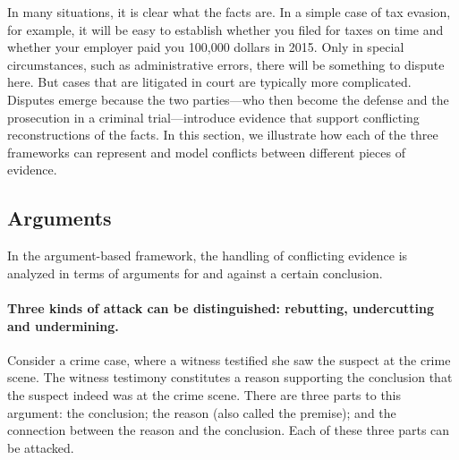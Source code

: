 \documentclass[10pt]{article}
\begin{document}
In many situations, it is clear what the facts are. In a simple case of tax evasion, for example, 
it will be easy to establish whether you filed for taxes on time and whether your employer paid you 100,000 dollars in 2015. Only in special circumstances, 
such as administrative errors, there will be something to dispute here. 
But cases that are litigated in court are typically more complicated.
Disputes emerge because the two parties---who then become the defense and the 
prosecution in a criminal trial---introduce evidence that support conflicting 
reconstructions of the facts. In this section, we illustrate how 
each of the three frameworks can represent and model conflicts 
between different pieces of evidence. 





\subsection{Arguments}
\label{sec:confArg}


In the argument-based framework, the handling of conflicting evidence is analyzed 
in terms of arguments for and against a certain conclusion.


\paragraph{Three kinds of attack can be distinguished: rebutting, undercutting and undermining.}

Consider a crime case, where a witness testified she saw the suspect at the crime scene. The witness testimony constitutes a 
reason supporting the conclusion that the suspect indeed was at the crime scene. There are three parts to this argument: the conclusion; the reason (also called the premise); and the connection between the reason and the conclusion.
Each of these three parts can be attacked. %
\end{document}
